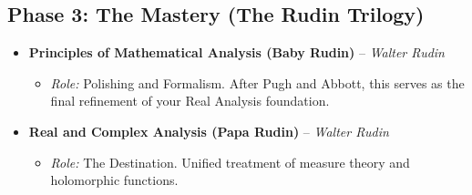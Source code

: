\subsection{Phase 3: The Mastery (The Rudin Trilogy)}
\begin{itemize}[leftmargin=1.5em]
    \item \textbf{Principles of Mathematical Analysis (Baby Rudin)} -- \textit{Walter Rudin}
    \begin{itemize}
        \item \textit{Role:} Polishing and Formalism. After Pugh and Abbott, this serves as the final refinement of your Real Analysis foundation.
    \end{itemize}
    \item \textbf{Real and Complex Analysis (Papa Rudin)} -- \textit{Walter Rudin}
    \begin{itemize}
        \item \textit{Role:} The Destination. Unified treatment of measure theory and holomorphic functions.
    \end{itemize}
\end{itemize}
